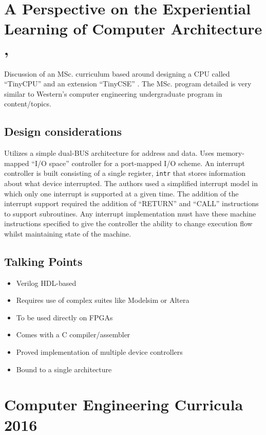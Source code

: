 \section{A Perspective on the Experiential Learning of Computer Architecture \cite{McLoughlin2010}, \cite{Nakamura2013}}

Discussion of an MSc. curriculum based around designing a CPU called ``TinyCPU'' \cite{McLoughlin2010} and an extension ``TinyCSE'' \cite{Nakamura2013}. The MSc. program detailed is very similar to Western's computer engineering undergraduate program in content/topics. 

\subsection{Design considerations}

Utilizes a simple dual-BUS architecture for address and data. Uses memory-mapped ``I/O space'' controller for a port-mapped I/O scheme. An interrupt controller is built consisting of a single register, \verb|intr| that stores information about what device interrupted. The authors used a simplified interrupt model in which only one interrupt is supported at a given time. The addition of the interrupt support required the addition of ``RETURN'' and ``CALL'' instructions to support subroutines. Any interrupt implementation must have these machine instructions specified to give the controller the ability to change execution flow whilst maintaining state of the machine. 


\subsection{Talking Points}

\begin{itemize}
\item Verilog HDL-based
\item Requires use of complex suites like Modelsim or Altera
\item To be used directly on FPGAs
\item Comes with a C compiler/assembler
\item Proved implementation of multiple device controllers
\item Bound to a single architecture
\end{itemize}

\section{Computer Engineering Curricula 2016 \cite{cec2016}}

